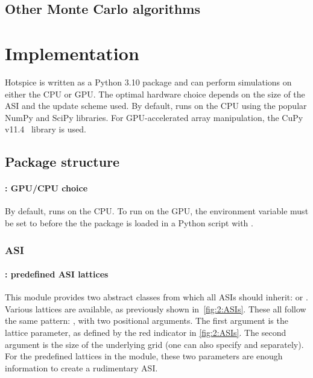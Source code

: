 \subsection{Other Monte Carlo algorithms} %

\section{Implementation}\label{sec:2:Implementation}
Hotspice is written as a Python 3.10 package and can perform simulations on either the CPU or GPU.
The optimal hardware choice depends on the size of the ASI and the update scheme used.
By default, \hotspice runs on the CPU using the popular NumPy and SciPy libraries.
For GPU-accelerated array manipulation, the CuPy v11.4~\cite{CuPy} library is used. \par
\subsection{Package structure} %
\paragraph{: GPU/CPU choice}
By default, \hotspice runs on the CPU. To run on the GPU, the environment variable  must be set to  before the the \hotspice package is loaded in a Python script with .
\subsubsection{ASI}
\paragraph{: predefined ASI lattices}
This module provides two abstract classes from which all ASIs should inherit:  or . Various lattices are available, as previously shown in~\cref{fig:2:ASIs}.
These all follow the same pattern: , with two positional arguments.
The first argument is the lattice parameter, as defined by the red indicator in \cref{fig:2:ASIs}.
The second argument is the size of the underlying grid (one can also specify  and  separately).
For the predefined lattices in the  module, these two parameters are enough information to create a rudimentary ASI.

